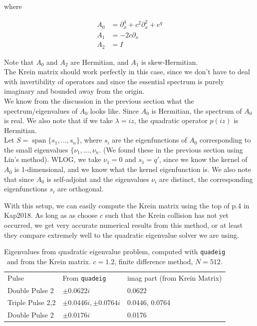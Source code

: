 \documentclass[12pt]{article}
\DeclareMathOperator{\spn}{span}
\begin{document}
where

\begin{align*}
A_0 &= \partial_x^4 + c^2 \partial_x^2 + e^{q} \\
A_1 &= - 2 c \partial_x \\
A_2 &= I 
\end{align*}

Note that $A_0$ and $A_2$ are Hermitian, and $A_1$ is skew-Hermitian.\\

The Krein matrix should work perfectly in this case, since we don't have to deal with invertibility of operators and since the essential spectrum is purely imaginary and bounded away from the origin.\\

We know from the discussion in the previous section what the spectrum/eigenvalues of $A_0$ looks like. Since $A_0$ is Hermitian, the spectrum of $A_0$ is real. We also note that if we take $\lambda = i z$, the quadratic operator $p(iz)$ is Hermitian.
\\

Let $S = \spn\{s_1, \dots, s_n \}$, where $s_i$ are the eigenfunctions of $A_0$ corresponding to the small eigenvalues $\{\nu_1, \dots, \nu_n$. (We found these in the previous section using Lin's method). WLOG, we take $\nu_1 = 0$ and $s_1 = q'$, since we know the kernel of $A_0$ is 1-dimensional, and we know what the kernel eigenfunction is. We also note that since $A_0$ is self-adjoint and the eigenvalues $\nu_i$ are distinct, the corresponding eigenfunctions $s_i$ are orthogonal.

With this setup, we can easily compute the Krein matrix using the top of p.4 in Kap2018. As long as as choose $c$ such that the Krein collision has not yet occurred, we get very accurate numerical results from this method, or at least they compare extremely well to the quadratic eigenvalue solver we are using. 

\begin{table}[H]
\begin{tabular}{lll}
Pulse & From \texttt{quadeig} & imag part (from Krein Matrix) \\
Double Pulse 2    & $\pm 0.0622i$ & 0.0622 \\
Triple Pulse 2,2  & $\pm 0.0446i, \pm 0.0764i$ & 0.0446, 0.0764 \\
Double Pulse 2    & $\pm 0.0176i$ & 0.0176 \\
\end{tabular}
\caption{Eigenvalues from quadratic eigenvalue problem, computed with \texttt{quadeig} and from the Krein matrix. $c = 1.2$, finite difference method, $N = 512$. }
\end{table}
\end{document}
